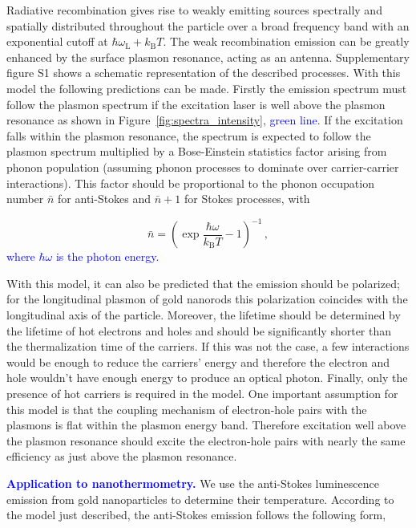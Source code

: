 \documentclass[journal=nalefd,manuscript=letter]{achemso}
\newcommand{\HI}[1]{\textcolor{blue}{#1}} %
\begin{document}
Radiative recombination gives rise to weakly emitting sources spectrally and
spatially distributed throughout the particle over a broad frequency band with
an exponential cutoff at $\hbar\omega_\textrm{L}+k_\textrm{B}T$. The weak
recombination emission can be greatly enhanced by the surface plasmon resonance,
acting as an antenna. Supplementary figure S1 shows a schematic representation
of the described processes. With this model the following predictions can be made.
Firstly the emission spectrum must follow the plasmon spectrum if the excitation
laser is well above the plasmon resonance as shown in \mbox{Figure
\ref{fig:spectra_intensity}}, \HI{green line}. If the excitation falls within the
plasmon resonance, the spectrum is expected to follow the plasmon spectrum
multiplied by a Bose-Einstein statistics factor arising from phonon population
(assuming phonon processes to dominate over carrier-carrier interactions).
This factor should be proportional to the phonon occupation number
$\bar{n}$ for anti-Stokes and $\bar{n}+1$ for Stokes processes, with

\begin{equation}\label{eqn:BE}
	\bar{n}=\left(\exp\frac{\hbar\omega}{k_\textrm{B}T}-1\right)^{-1}\,,
\end{equation}
\HI{where $\hbar\omega$ is the photon energy.}

With this model, it can also be predicted that the emission should be polarized;
for the longitudinal plasmon of gold nanorods this polarization coincides with
the longitudinal axis of the particle\cite{He2015}. Moreover, the lifetime
should be determined by the lifetime of hot electrons and holes and should be
significantly shorter than the thermalization time of the carriers. If this was
not the case, a few interactions would be enough to reduce the carriers' energy
and therefore the electron and hole wouldn't have enough energy to produce an
optical photon. Finally, only the presence of hot carriers is required in the
model. One important assumption for this model is that the coupling 
mechanism of electron-hole pairs with the plasmons is flat within the plasmon 
energy band. Therefore excitation well above the plasmon resonance should excite the 
electron-hole pairs with nearly the same efficiency as just above the plasmon
resonance\cite{Cheng2015}. 

\HI{\textbf{Application to nanothermometry.}} We use the anti-Stokes luminescence emission from gold
nanoparticles to determine their temperature. According to the model just
described, the anti-Stokes emission follows the following form,
\end{document}
